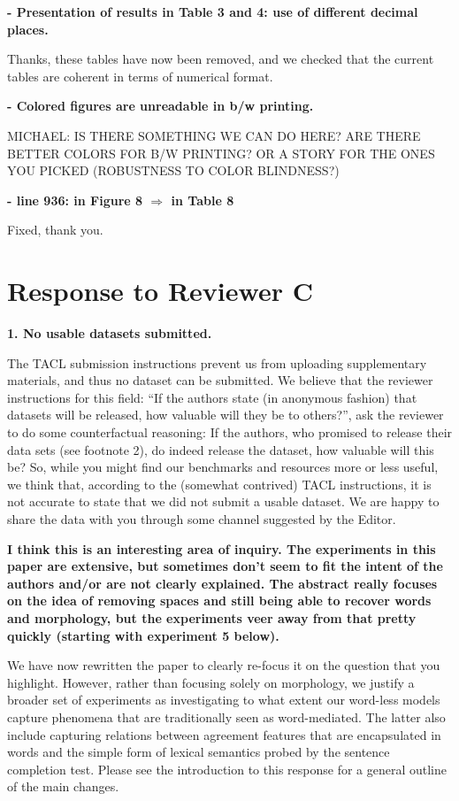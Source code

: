 \documentclass{article}
\begin{document}
\textbf{- Presentation of results in Table 3 and 4: use of different decimal places.}

Thanks, these tables have now been removed, and we checked that the current tables are coherent in terms of numerical format.
\newline

\textbf{- Colored figures are unreadable in b/w printing.}



MICHAEL: IS THERE SOMETHING WE CAN DO HERE? ARE THERE BETTER COLORS FOR B/W PRINTING? OR A STORY FOR THE ONES YOU PICKED (ROBUSTNESS TO COLOR BLINDNESS?)
\newline


\textbf{- line 936: in Figure 8 $\Rightarrow$ in Table 8}

Fixed, thank you.


\section{Response to Reviewer C}

\textbf{1. No usable datasets submitted.}

The TACL submission instructions prevent us from uploading supplementary materials, and thus no dataset can be submitted. We believe that the reviewer instructions for this field: ``If the authors state (in anonymous fashion) that datasets will be released, how valuable will they be to others?'', ask the reviewer to do some counterfactual reasoning: If the authors, who promised to release their data sets (see footnote 2), do indeed release the dataset, how valuable will this be? So, while you might find our benchmarks and resources more or less useful, we think that, according to the (somewhat contrived) TACL instructions, it is not accurate to state that we did not submit a usable dataset. We are happy to share the data with you through some channel suggested by the Editor.
\newline

\textbf{I think this is an interesting area of inquiry.  The experiments in this paper are extensive, but sometimes don't seem to fit the intent of the authors and/or are not clearly explained.  The abstract really focuses on the idea of removing spaces and still being able to recover words and morphology, but the experiments veer away from that pretty quickly (starting with experiment 5 below).}

We have now rewritten the paper to clearly re-focus it on the question that you highlight. However, rather than focusing solely on morphology, we justify a broader set of experiments as investigating to what extent our word-less models capture phenomena that are traditionally seen as word-mediated. The latter also include capturing relations between agreement features that are encapsulated in words and the simple form of lexical semantics probed by the sentence completion test. Please see the introduction to this response for a general outline of the main changes.
\newline
\end{document}

